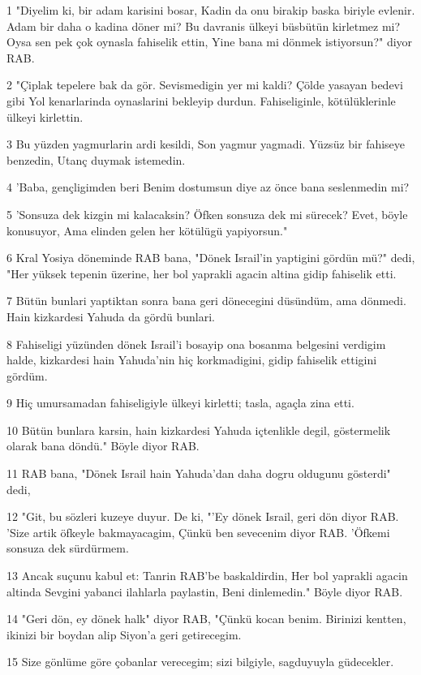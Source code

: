 \par 1 "Diyelim ki, bir adam karisini bosar, Kadin da onu birakip baska biriyle evlenir. Adam bir daha o kadina döner mi? Bu davranis ülkeyi büsbütün kirletmez mi? Oysa sen pek çok oynasla fahiselik ettin, Yine bana mi dönmek istiyorsun?" diyor RAB.
\par 2 "Çiplak tepelere bak da gör. Sevismedigin yer mi kaldi? Çölde yasayan bedevi gibi Yol kenarlarinda oynaslarini bekleyip durdun. Fahiseliginle, kötülüklerinle ülkeyi kirlettin.
\par 3 Bu yüzden yagmurlarin ardi kesildi, Son yagmur yagmadi. Yüzsüz bir fahiseye benzedin, Utanç duymak istemedin.
\par 4 'Baba, gençligimden beri Benim dostumsun diye az önce bana seslenmedin mi?
\par 5 'Sonsuza dek kizgin mi kalacaksin? Öfken sonsuza dek mi sürecek? Evet, böyle konusuyor, Ama elinden gelen her kötülügü yapiyorsun."
\par 6 Kral Yosiya döneminde RAB bana, "Dönek Israil'in yaptigini gördün mü?" dedi, "Her yüksek tepenin üzerine, her bol yaprakli agacin altina gidip fahiselik etti.
\par 7 Bütün bunlari yaptiktan sonra bana geri dönecegini düsündüm, ama dönmedi. Hain kizkardesi Yahuda da gördü bunlari.
\par 8 Fahiseligi yüzünden dönek Israil'i bosayip ona bosanma belgesini verdigim halde, kizkardesi hain Yahuda'nin hiç korkmadigini, gidip fahiselik ettigini gördüm.
\par 9 Hiç umursamadan fahiseligiyle ülkeyi kirletti; tasla, agaçla zina etti.
\par 10 Bütün bunlara karsin, hain kizkardesi Yahuda içtenlikle degil, göstermelik olarak bana döndü." Böyle diyor RAB.
\par 11 RAB bana, "Dönek Israil hain Yahuda'dan daha dogru oldugunu gösterdi" dedi,
\par 12 "Git, bu sözleri kuzeye duyur. De ki, "'Ey dönek Israil, geri dön diyor RAB. 'Size artik öfkeyle bakmayacagim, Çünkü ben sevecenim diyor RAB. 'Öfkemi sonsuza dek sürdürmem.
\par 13 Ancak suçunu kabul et: Tanrin RAB'be baskaldirdin, Her bol yaprakli agacin altinda Sevgini yabanci ilahlarla paylastin, Beni dinlemedin." Böyle diyor RAB.
\par 14 "Geri dön, ey dönek halk" diyor RAB, "Çünkü kocan benim. Birinizi kentten, ikinizi bir boydan alip Siyon'a geri getirecegim.
\par 15 Size gönlüme göre çobanlar verecegim; sizi bilgiyle, sagduyuyla güdecekler.
